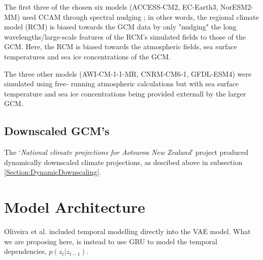 The first three of the chosen six models (ACCESS-CM2, EC-Earth3, NorESM2-MM) used CCAM through
spectral nudging \cite{user-guidance}; in other words, the regional climate model (RCM) is 
biased towards the GCM data by only "nudging" the long wavelengths/large-scale features of 
the RCM's simulated fields to those of the GCM. Here, the RCM is biased towards the atmospheric
fields, sea surface temperatures and sea ice concentrations of the GCM.

The three other models (AWI-CM-1-1-MR, CNRM-CM6-1, GFDL-ESM4) were simulated using free-
running atmospheric calculations but with sea surface temperature and sea ice concentrations   
being provided externall by the larger GCM.

\subsection{Downscaled GCM's}

The `\textit{National climate projections for Aotearoa New Zealand}' project produced
dynamically downscaled climate projections, as descibed above in subsection \ref{Section:DynamicDownscaling}.


\section{Model Architecture}

Oliveira et al. \cite{vae-synthesis} included temporal modelling directly into the VAE model. 
What we are proposing here, is instead to use GRU to model the temporal dependencies, $p(z_t|
z_{t-1})$.
